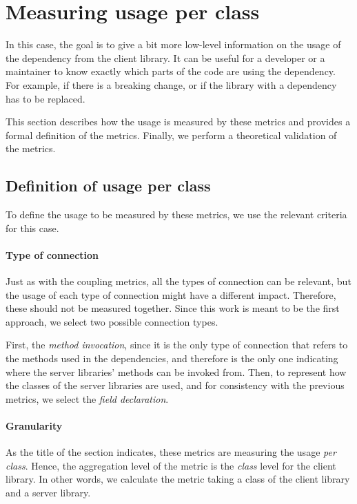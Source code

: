 \section{Measuring usage per class}

In this case, the goal is to give a bit more low-level information on the usage of the dependency from the client library. It can be useful for a developer or a maintainer to know exactly which parts of the code are using the dependency. For example, if there is a breaking change, or if the library with a dependency has to be replaced.

This section describes how the usage is measured by these metrics and provides a formal definition of the metrics. Finally, we perform a theoretical validation of the metrics.

\subsection{Definition of usage per class}
To define the usage to be measured by these metrics, we use the relevant criteria for this case.

\paragraph{Type of connection}
Just as with the coupling metrics, all the types of connection can be relevant, but the usage of each type of connection might have a different impact. Therefore, these should not be measured together. Since this work is meant to be the first approach, we select two possible connection types.

First, the \textit{method invocation}, since it is the only type of connection that refers to the methods used in the dependencies, and therefore is the only one indicating where the server libraries' methods can be invoked from. Then, to represent how the classes of the server libraries are used, and for consistency with the previous metrics, we select the \textit{field declaration}.

\paragraph{Granularity}

As the title of the section indicates, these metrics are measuring the usage \textit{per class}. Hence, the aggregation level of the metric is the \textit{class} level for the client library. In other words, we calculate the metric taking a class of the client library and a server library.

